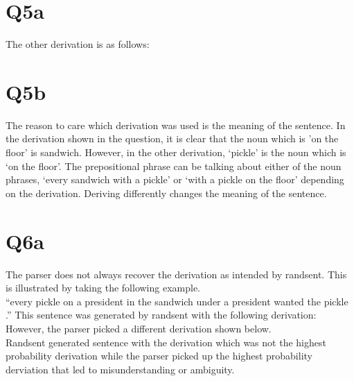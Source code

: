 \documentclass[12pt]{article}
\begin{document}
\section*{Q5a}
The other derivation is as follows:
\pagebreak
\section*{Q5b}
The reason to care which derivation was used is the meaning of the sentence. In the derivation shown in the question, it is clear that the noun which is 'on the floor’ is sandwich. However, in the other derivation, ‘pickle’ is the noun which is ‘on the floor’. The prepositional phrase can be talking about either of the noun phrases, ‘every sandwich with a pickle’ or ‘with a pickle on the floor’ depending on the derivation. Deriving differently changes the meaning of the sentence.\\
\pagebreak
\section*{Q6a}
The parser does not always recover the derivation as intended by randsent. This is illustrated by taking the following example.\\
“every pickle on a president in the sandwich under a president wanted the pickle .” This sentence was generated by randsent with the following derivation:\\
However, the parser picked a different derivation shown below.\\
Randsent generated sentence with the derivation which was not the highest probability derivation while the parser picked up the highest probability derviation that led to misunderstanding or ambiguity.\\
\pagebreak
\end{document}
